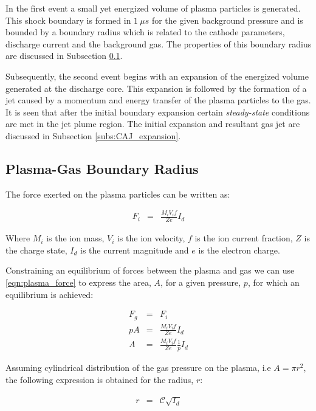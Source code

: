 \documentclass[a4paper]{iacas}%
\begin{document}
In the first event a small yet energized volume of plasma particles is generated. This shock boundary is formed in $1~\mu s$ for the given background pressure \cite{meunier1987experimental} and is bounded by a boundary radius which is related to the cathode parameters, discharge current and the background gas. The properties of this boundary radius are discussed in Subsection \ref{subs:boundary_radius}. 

Subsequently, the second event begins with an expansion of the energized volume generated at the discharge core. This expansion is followed by the formation of a jet caused by a momentum and energy transfer of the plasma particles to the gas. It is seen that after the initial boundary expansion certain \textit{steady-state} conditions are met in the jet plume region. The initial expansion and resultant gas jet are discussed in Subsection \ref{subs:CAJ_expansion}. 

\subsection{Plasma-Gas Boundary Radius}\label{subs:boundary_radius}

The force exerted on the plasma particles can be written as:

\begin{eqnarray}\label{eqn:plasma_force}
	F_i &= &\frac{M_i V_i f}{Z e} I_d
\end{eqnarray}

Where $M_i$ is the ion mass, $V_i$ is the ion velocity, $f$ is the ion current fraction, $Z$ is the charge state, $I_d$ is the current magnitude and $e$ is the electron charge.

Constraining an equilibrium of forces between the plasma and gas we can use \eqref{eqn:plasma_force} to express the area, $A$, for a given pressure, $p$, for which an equilibrium is achieved:

\begin{eqnarray}\label{}
	F_g & = & F_i \\\label{eqn:rel_equiv_force}
	p A & = & \frac{M_i V_i f}{Z e} I_d\\
	A & = & \frac{M_i V_i f}{Z e} \frac{1}{p} I_d
\end{eqnarray}

Assuming cylindrical distribution of the gas pressure on the plasma, i.e $A = \pi r^2$, the following expression is obtained for the radius, $r$:

\begin{eqnarray}
\label{eqn:rad_equiv_force}
	r & = & \mathcal{C}\sqrt{I_d}
\end{eqnarray}
\end{document}
